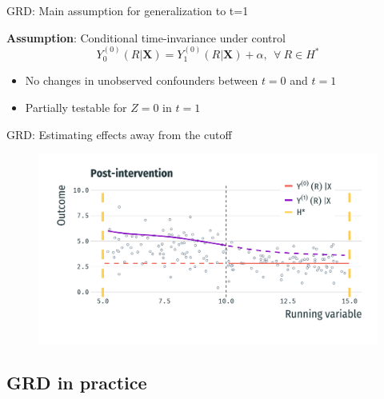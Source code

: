 \documentclass[usenames,dvipsnames,11pt,aspectratio=169]{beamer}
\begin{document}
\begin{frame}{GRD: Main assumption for generalization to t=1}

\begin{block}{\textbf{Assumption}: Conditional time-invariance under control}
$$Y_{0}^{(0)}(R|\textbf{X}) = Y_{1}^{(0)}(R|\textbf{X}) + \alpha, \ \ \forall \ R\in H^*$$
\end{block}
\begin{itemize}
\item No changes in unobserved confounders between $t=0$ and $t=1$
\item Partially testable for $Z=0$ in $t=1$
\end{itemize}
\end{frame}

\begin{frame}{GRD: Estimating effects away from the cutoff}
\begin{figure}[!htb]
\centering
   \includegraphics[width=\textwidth]{figures/setup_detrend.pdf}
\end{figure}
\end{frame}

\subsection{GRD in practice}
\end{document}
